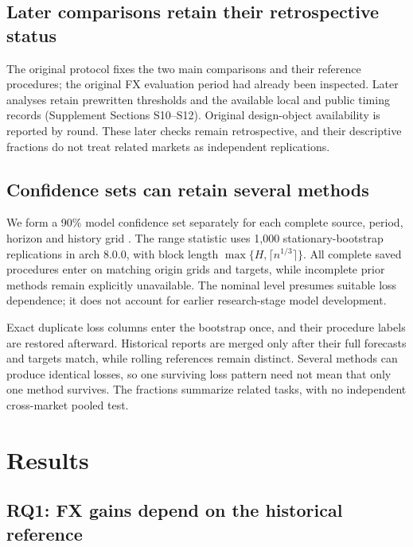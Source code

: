 \documentclass[12pt,a4paper]{article}
\begin{document}
\subsection{Later comparisons retain their retrospective status}

The original protocol fixes the two main comparisons and their reference procedures; the original FX evaluation period had already been inspected. Later analyses retain prewritten thresholds and the available local and public timing records (Supplement Sections S10--S12). Original design-object availability is reported by round. These later checks remain retrospective, and their descriptive fractions do not treat related markets as independent replications.

\subsection{Confidence sets can retain several methods}

We form a 90\% model confidence set separately for each complete source, period, horizon and history grid \cite{mcs2011}. The range statistic uses 1,000 stationary-bootstrap replications in arch 8.0.0, with block length $\max\{H,\lceil n^{1/3}\rceil\}$. All complete saved procedures enter on matching origin grids and targets, while incomplete prior methods remain explicitly unavailable. The nominal level presumes suitable loss dependence; it does not account for earlier research-stage model development.

Exact duplicate loss columns enter the bootstrap once, and their procedure labels are restored afterward. Historical reports are merged only after their full forecasts and targets match, while rolling references remain distinct. Several methods can produce identical losses, so one surviving loss pattern need not mean that only one method survives. The fractions summarize related tasks, with no independent cross-market pooled test.

\FloatBarrier

\section{Results}\label{sec:results}

\subsection{RQ1: FX gains depend on the historical reference}\label{sec:rq1}
\end{document}
